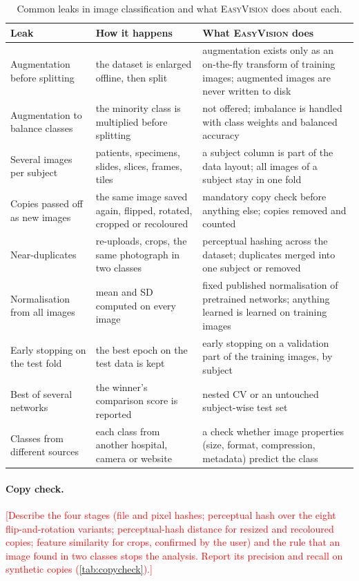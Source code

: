 \documentclass[11pt,a4paper]{article}
\newcommand{\EV}{\textsc{EasyVision}}
\newcommand{\TBD}[1]{\textcolor{red}{[#1]}}
\begin{document}
\begin{table}[t]
\centering\small
\caption{Common leaks in image classification and what \EV{} does about each.}
\label{tab:leaks}
\begin{tabularx}{\linewidth}{@{}>{\raggedright\arraybackslash}p{3.2cm}>{\raggedright\arraybackslash}X>{\raggedright\arraybackslash}X@{}}
\toprule
Leak & How it happens & What \EV{} does \\
\midrule
Augmentation before splitting & the dataset is enlarged offline, then split & augmentation exists only as an on-the-fly transform of training images; augmented images are never written to disk \\
Augmentation to balance classes & the minority class is multiplied before splitting & not offered; imbalance is handled with class weights and balanced accuracy \\
Several images per subject & patients, specimens, slides, slices, frames, tiles & a subject column is part of the data layout; all images of a subject stay in one fold \\
Copies passed off as new images & the same image saved again, flipped, rotated, cropped or recoloured & mandatory copy check before anything else; copies removed and counted \\
Near-duplicates & re-uploads, crops, the same photograph in two classes & perceptual hashing across the dataset; duplicates merged into one subject or removed \\
Normalisation from all images & mean and SD computed on every image & fixed published normalisation of pretrained networks; anything learned is learned on training images \\
Early stopping on the test fold & the best epoch on the test data is kept & early stopping on a validation part of the training images, by subject \\
Best of several networks & the winner's comparison score is reported & nested CV or an untouched subject-wise test set \\
Classes from different sources & each class from another hospital, camera or website & a check whether image properties (size, format, compression, metadata) predict the class \\
\bottomrule
\end{tabularx}
\end{table}

\paragraph{Copy check.} \TBD{Describe the four stages (file and pixel hashes; perceptual hash over the eight flip-and-rotation variants; perceptual-hash distance for resized and recoloured copies; feature similarity for crops, confirmed by the user) and the rule that an image found in two classes stops the analysis. Report its precision and recall on synthetic copies (\cref{tab:copycheck}).}
\end{document}
